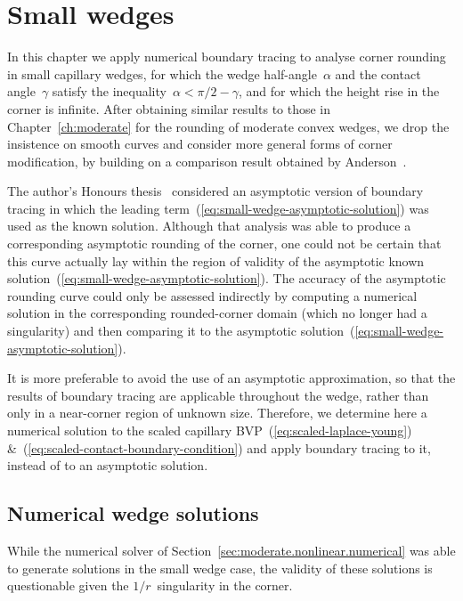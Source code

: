 \chapter{Small wedges}
\label{ch:small}

In this chapter
we apply numerical boundary tracing to analyse corner rounding
in small capillary wedges,
for which the wedge half-angle~$\alpha$ and the contact angle~$\gamma$
satisfy the inequality~$\alpha < \pi/2 - \gamma$,
and for which the height rise in the corner is infinite.
After obtaining similar results to those in Chapter~\ref{ch:moderate}
for the rounding of moderate convex wedges,
we drop the insistence on smooth curves
and consider more general forms of corner modification,
by building on a comparison result
obtained by
Anderson~\cite[Section~7.3.2]{anderson-2002-thesis-boundary-tracing-pdes}.

\thematicbreak

The author's Honours thesis~%
  \cite{li-2017-thesis-rounding-capillary-wedge}
considered an asymptotic version of boundary tracing
in which the leading term~(\ref{eq:small-wedge-asymptotic-solution})
was used as the known solution.
Although that analysis was able to produce
a corresponding asymptotic rounding of the corner,
one could not be certain that this curve actually lay
within the region of validity
of the asymptotic known solution~(\ref{eq:small-wedge-asymptotic-solution}).
The accuracy of the asymptotic rounding curve
could only be assessed indirectly
by computing a numerical solution in the corresponding rounded-corner domain
(which no longer had a singularity)
and then comparing it
to the asymptotic solution~(\ref{eq:small-wedge-asymptotic-solution}).

It is more preferable to avoid the use of an asymptotic approximation,
so that the results of boundary tracing are applicable throughout the wedge,
rather than only in a near-corner region of unknown size.
Therefore, we determine here a numerical solution
to the scaled capillary BVP~(\ref{eq:scaled-laplace-young})
\&~(\ref{eq:scaled-contact-boundary-condition})
and apply boundary tracing to it,
instead of to an asymptotic solution.

\section{Numerical wedge solutions}
\label{sec:small.numerical}

While the numerical solver of Section~\ref{sec:moderate.nonlinear.numerical}
was able to generate solutions in the small wedge case,
the validity of these solutions is questionable
given the $1/r$~singularity in the corner.


